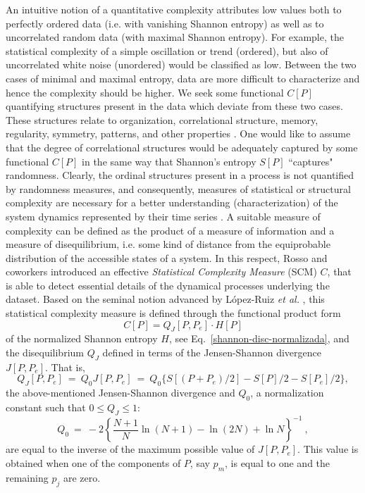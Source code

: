 An intuitive notion of a quantitative complexity attributes low values both to perfectly ordered data (i.e. with vanishing Shannon entropy) as well as to uncorrelated random data (with maximal Shannon entropy).
For example, the statistical complexity of a simple oscillation or trend (ordered), but also of uncorrelated white noise (unordered) would be classified as low.
Between the two cases of minimal and maximal entropy, data are more difficult to characterize and hence the complexity should be higher.
We seek some functional $C[P]$ quantifying structures present in the data which deviate from these two cases.
These structures relate to organization, correlational structure, memory, regularity, symmetry, patterns, and other properties \cite{Feldman2008}.
One would like to assume that the degree of correlational structures would be adequately captured by some functional $C[P]$ in the same way that Shannon's entropy $S[P]$ \cite{Shannon1948} ``captures" randomness.
Clearly, the ordinal structures present in a process is not quantified by randomness measures, and consequently, measures of statistical or structural complexity are necessary for a better understanding (characterization) of the system dynamics represented by their time series \cite{Crutchfield1998}. 
A suitable measure of complexity can be defined as the product of a measure of information and a measure of
disequilibrium, i.e. some kind of distance from the equiprobable distribution of the accessible states of 
a system. 
In this respect, Rosso and coworkers \cite{Lamberti2004} introduced an effective {\it Statistical Complexity Measure\/} (SCM) $C$, that is able to detect essential details of the dynamical processes underlying the dataset.
Based on the seminal notion advanced by L\'opez-Ruiz {\it et al.} \cite{LMC1995}, this statistical complexity measure\cite{Martin2003,Lamberti2004} is defined through the functional product form
\begin{equation}
C[P] = Q_{J}[P,P_e] \cdot H[P]
\label{complexity}
\end{equation}
of the normalized Shannon entropy $H$, see Eq.~\eqref{shannon-disc-normalizada}, and the disequilibrium $Q_{J}$ defined in terms of the Jensen-Shannon divergence $J[P, P_e]$.
That is,
\begin{equation}
\label{disequilibrium}
Q_{J} [ P, P_e] ~=~ Q_{0} J[ P, P_e] ~=~ 
Q_{0} \{ S[(P + P_e)/2 ] - S[ P ]/2 - S[P_e]/2\},
\end{equation}
the above-mentioned Jensen-Shannon divergence and $Q_0$, a normalization constant such that $0 \leq Q_{J} \leq 1$:
\begin{equation}
Q_0 ~=~ -2 \left\{ {\frac{N+1}{N}} \ln (N+1) - \ln (2N) + \ln N \right\}^{-1} \ ,
\label{q0-jensen-1}
\end{equation}
are equal to the inverse of the maximum possible value of $J [P,P_e]$.
This value is obtained when one of the components of $P$, say $p_m$, is equal to one and the remaining $p_j$ are zero.

